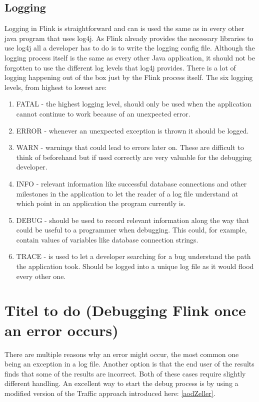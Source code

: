 \subsection{Logging}
Logging in Flink is straightforward and can is used the same as in every other java program that uses log4j. As Flink already provides the necessary libraries to use log4j all a developer has to do is to write the logging config file. Although the logging process itself is the same as every other Java application, it should not be forgotten to use the different log levels that log4j provides. There is a lot of logging happening out of the box just by the Flink process itself. The six logging levels, from highest to lowest are:
\begin{enumerate}
  \item FATAL - the highest logging level, should only be used when the application cannot continue to work because of an unexpected error.
  \item ERROR - whenever an unexpected exception is thrown it should be logged.
  \item WARN - warnings that could lead to errors later on. These are difficult to think of beforehand but if used correctly are very valuable for the debugging developer.
  \item INFO - relevant information like successful database connections and other milestones in the application to let the reader of a log file understand at which point in an application the program currently is.
  \item DEBUG - should be used to record relevant information along the way that could be useful to a programmer when debugging. This could, for example, contain values of variables like database connection strings.
  \item TRACE - is used to let a developer searching for a bug understand the path the application took. Should be logged into a unique log file as it would flood every other one.
\end{enumerate}

\section{Titel to do (Debugging Flink once an error occurs)}

There are multiple reasons why an error might occur, the most common one being an exception in a log file. Another option is that the end user of the results finds that some of the results are incorrect. Both of these cases require slightly different handling. An excellent way to start the debug process is by using a modified version of the Traffic approach introduced here: \ref{aodZeller}.

